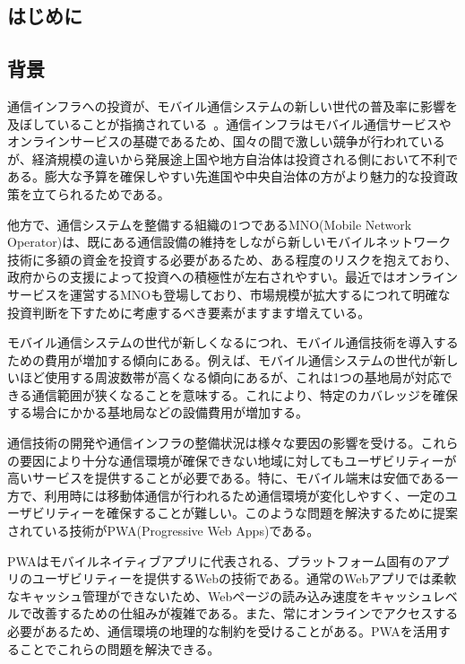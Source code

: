 \maketitle
\begin{multicols*}{2}

\section{はじめに}
\subsection{背景}
通信インフラへの投資が、モバイル通信システムの新しい世代の普及率に影響を及ぼしていることが指摘されている~\cite{Forge2020FormingA5GStrategyForDevelopingCountries}。通信インフラはモバイル通信サービスやオンラインサービスの基礎であるため、国々の間で激しい競争が行われているが、経済規模の違いから発展途上国や地方自治体は投資される側において不利である。膨大な予算を確保しやすい先進国や中央自治体の方がより魅力的な投資政策を立てられるためである。

他方で、通信システムを整備する組織の1つであるMNO(Mobile Network Operator)は、既にある通信設備の維持をしながら新しいモバイルネットワーク技術に多額の資金を投資する必要があるため、ある程度のリスクを抱えており、政府からの支援によって投資への積極性が左右されやすい。最近ではオンラインサービスを運営するMNOも登場しており、市場規模が拡大するにつれて明確な投資判断を下すために考慮するべき要素がますます増えている。

モバイル通信システムの世代が新しくなるにつれ、モバイル通信技術を導入するための費用が増加する傾向にある。例えば、モバイル通信システムの世代が新しいほど使用する周波数帯が高くなる傾向にあるが、これは1つの基地局が対応できる通信範囲が狭くなることを意味する。これにより、特定のカバレッジを確保する場合にかかる基地局などの設備費用が増加する。

通信技術の開発や通信インフラの整備状況は様々な要因の影響を受ける。これらの要因により十分な通信環境が確保できない地域に対してもユーザビリティーが高いサービスを提供することが必要である。特に、モバイル端末は安価である一方で、利用時には移動体通信が行われるため通信環境が変化しやすく、一定のユーザビリティーを確保することが難しい。このような問題を解決するために提案されている技術がPWA(Progressive Web Apps)である。

PWAはモバイルネイティブアプリに代表される、プラットフォーム固有のアプリのユーザビリティーを提供するWebの技術である。通常のWebアプリでは柔軟なキャッシュ管理ができないため、Webページの読み込み速度をキャッシュレベルで改善するための仕組みが複雑である。また、常にオンラインでアクセスする必要があるため、通信環境の地理的な制約を受けることがある。PWAを活用することでこれらの問題を解決できる。


\end{multicols*}
